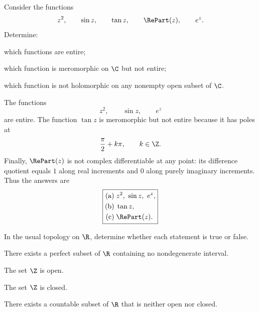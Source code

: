     \begin{expectedproblem}
        Consider the functions
        \[
            z^2,
            \qquad
            \sin z,
            \qquad
            \tan z,
            \qquad
            \RePart(z),
            \qquad
            e^z.
        \]
        Determine:
        \begin{problemsubparts}
            \item which functions are entire;
            \item which function is meromorphic on $\C$ but not entire;
            \item which function is not holomorphic on any nonempty open
                  subset of $\C$.
        \end{problemsubparts}
    \end{expectedproblem}

    \begin{solution}
        The functions
        \[
            z^2,
            \qquad
            \sin z,
            \qquad
            e^z
        \]
        are entire. The function $\tan z$ is meromorphic but not entire because
        it has poles at
        \[
            \frac{\pi}{2}+k\pi,
            \qquad
            k\in\Z.
        \]
        Finally, $\RePart(z)$ is not complex differentiable at any point: its
        difference quotient equals $1$ along real increments and $0$ along
        purely imaginary increments. Thus the answers are
        \[
            \boxed{
                \begin{aligned}
                    \text{(a)}\;&z^2,\ \sin z,\ e^z,\\
                    \text{(b)}\;&\tan z,\\
                    \text{(c)}\;&\RePart(z).
                \end{aligned}
            }
        \]
    \end{solution}

    \begin{expectedproblem}
        In the usual topology on $\R$, determine whether each statement is true
        or false.
        \begin{problemchoices}
            \item There exists a perfect subset of $\R$ containing no
                  nondegenerate interval.
            \item The set $\Z$ is open.
            \item The set $\Z$ is closed.
            \item There exists a countable subset of $\R$ that is neither
                  open nor closed.
        \end{problemchoices}
    \end{expectedproblem}

